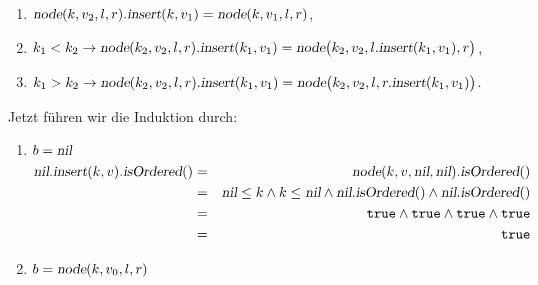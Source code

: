 \documentclass{article}
\begin{document}
\begin{enumerate}
\begin{enumerate}
      \item $\textsl{node}(k, v_2, l, r)\mathtt{.}\textsl{insert}(k,v_1) = \textsl{node}(k, v_1, l, r)$,
      \item $k_1 < k_2 \rightarrow 
             \textsl{node}(k_2, v_2, l, r)\mathtt{.}\textsl{insert}(k_1, v_1) =
             \textsl{node}\bigl(k_2, v_2, l\mathtt{.}\textsl{insert}(k_1, v_1), r\bigr)$,
      \item $k_1 > k_2 \rightarrow 
             \textsl{node}(k_2, v_2, l, r)\mathtt{.}\textsl{insert}(k_1, v_1) = 
             \textsl{node}\bigl(k_2, v_2, l, r\mathtt{.}\textsl{insert}(k_1, v_1)\bigr)$.
      \end{enumerate}
      Jetzt f\"uhren wir die Induktion durch:
      \begin{enumerate}
      \item $b = \textsl{nil}$
            \begin{eqnarray*}
                  \textsl{nil}.\textsl{insert}(k,v).\textsl{isOrdered}()
            & = & \textsl{node}(k,v,\textsl{nil},\textsl{nil}).\textsl{isOrdered}() \\
            & = & \textsl{nil} \leq k \wedge k \leq \textsl{nil} 
                  \wedge \textsl{nil}.\textsl{isOrdered}()\wedge \textsl{nil}.\textsl{isOrdered}() \\
            & = & \mathtt{true} \wedge \mathtt{true} \wedge \mathtt{true} \wedge \mathtt{true}  \\
            & = & \mathtt{true}
            \end{eqnarray*}
      \item $b = \textsl{node}(k,v_0,l,r)$


\end{enumerate}
\end{enumerate}
\end{document}
